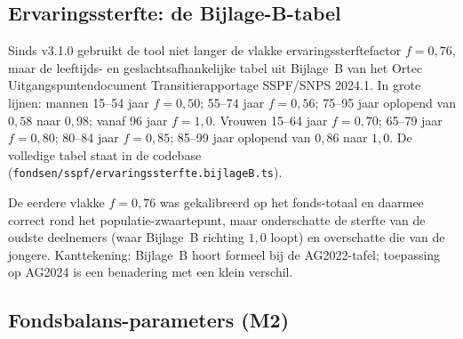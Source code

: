 \documentclass[11pt,a4paper]{article}
\newcommand{\code}[1]{\texttt{#1}}
\begin{document}
\subsection{Ervaringssterfte: de Bijlage-B-tabel}
\label{sec:ervaringssterfte}

Sinds v3.1.0 gebruikt de tool niet langer de vlakke ervaringssterftefactor $f = 0{,}76$, maar de leeftijds- en geslachtsafhankelijke tabel uit Bijlage~B van het Ortec Uitgangspuntendocument Transitierapportage SSPF/SNPS 2024.1. In grote lijnen: mannen 15--54 jaar $f = 0{,}50$; 55--74 jaar $f = 0{,}56$; 75--95 jaar oplopend van $0{,}58$ naar $0{,}98$; vanaf 96 jaar $f = 1{,}0$. Vrouwen 15--64 jaar $f = 0{,}70$; 65--79 jaar $f = 0{,}80$; 80--84 jaar $f = 0{,}85$; 85--99 jaar oplopend van $0{,}86$ naar $1{,}0$. De volledige tabel staat in de codebase (\code{fondsen/sspf/ervaringssterfte.bijlageB.ts}).

De eerdere vlakke $f = 0{,}76$ was gekalibreerd op het fonds-totaal en daarmee correct rond het populatie-zwaartepunt, maar onderschatte de sterfte van de oudste deelnemers (waar Bijlage~B richting $1{,}0$ loopt) en overschatte die van de jongere. Kanttekening: Bijlage~B hoort formeel bij de AG2022-tafel; toepassing op AG2024 is een benadering met een klein verschil.

\subsection{Fondsbalans-parameters (M2)}
\end{document}
